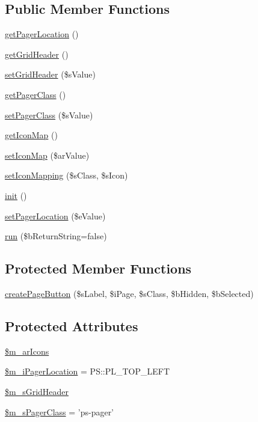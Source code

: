 \subsection*{Public Member Functions}
\begin{DoxyCompactItemize}
\item 
\hyperlink{classCPSLinkPager_ac50fcc4175908b1f7f9942b21a40d5ac}{getPagerLocation} ()
\item 
\hyperlink{classCPSLinkPager_a3798007d8cad79c6f759093ddb3f7e7b}{getGridHeader} ()
\item 
\hyperlink{classCPSLinkPager_adea1e1811c83e3cd522f3e7c0546c9bc}{setGridHeader} (\$sValue)
\item 
\hyperlink{classCPSLinkPager_a2f28854e9d1bc12c67e28e90f42140e4}{getPagerClass} ()
\item 
\hyperlink{classCPSLinkPager_a80c3fabd278bc403817b105fe0cf1781}{setPagerClass} (\$sValue)
\item 
\hyperlink{classCPSLinkPager_a59b86cf9f70eb2aa379a97a11059d05b}{getIconMap} ()
\item 
\hyperlink{classCPSLinkPager_adea4601405c2bd453d1e6516285ddc37}{setIconMap} (\$arValue)
\item 
\hyperlink{classCPSLinkPager_a70e354a4bdaa31524648088648d3130f}{setIconMapping} (\$sClass, \$sIcon)
\item 
\hyperlink{classCPSLinkPager_a4be4055f3361d4800e16bc2e2e38cda6}{init} ()
\item 
\hyperlink{classCPSLinkPager_a8608d6f2314b2052b0825fc7e3e273c6}{setPagerLocation} (\$eValue)
\item 
\hyperlink{classCPSLinkPager_a62147bc090e0bf469576dac68ebc87ef}{run} (\$bReturnString=false)
\end{DoxyCompactItemize}
\subsection*{Protected Member Functions}
\begin{DoxyCompactItemize}
\item 
\hyperlink{classCPSLinkPager_a751898880be0b6d98e46305ff1a44961}{createPageButton} (\$sLabel, \$iPage, \$sClass, \$bHidden, \$bSelected)
\end{DoxyCompactItemize}
\subsection*{Protected Attributes}
\begin{DoxyCompactItemize}
\item 
\hyperlink{classCPSLinkPager_ae4118d5b329c49bd2c9fd36ff81b97bc}{\$m\_\-arIcons}
\item 
\hyperlink{classCPSLinkPager_a7e3aac300195da83237f2dd67597ef48}{\$m\_\-iPagerLocation} = PS::PL\_\-TOP\_\-LEFT
\item 
\hyperlink{classCPSLinkPager_ab673af639dc3ac6ee6389566f2429afa}{\$m\_\-sGridHeader}
\item 
\hyperlink{classCPSLinkPager_a5086c17fa969cb55f0b0a166a29f1158}{\$m\_\-sPagerClass} = 'ps-\/pager'
\end{DoxyCompactItemize}


